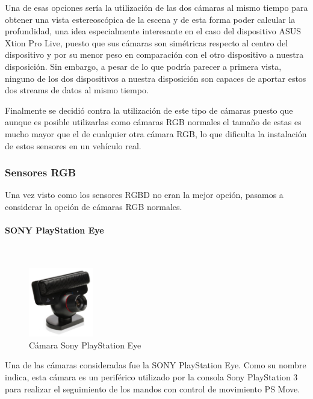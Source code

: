 Una de esas opciones sería la utilización de las dos cámaras al mismo tiempo para obtener una vista estereoscópica de la escena y de esta forma poder calcular la profundidad, una idea especialmente interesante en el caso del dispositivo ASUS Xtion Pro Live, puesto que sus cámaras son simétricas respecto al centro del dispositivo y por su menor peso en comparación con el otro dispositivo a nuestra disposición.
Sin embargo, a pesar de lo que podría parecer a primera vista, ninguno de los dos dispositivos a nuestra disposición son capaces de aportar estos dos streams de datos al mismo tiempo.

Finalmente se decidió contra la utilización de este tipo de cámaras puesto que aunque es posible utilizarlas como cámaras RGB normales el tamaño de estas es mucho mayor que el de cualquier otra cámara RGB, lo que dificulta la instalación de estos sensores en un vehículo real. 


\subsubsection{Sensores RGB}
Una vez visto como los sensores RGBD no eran la mejor opción, pasamos a considerar la opción de cámaras RGB normales.

\paragraph{SONY PlayStation Eye}\mbox{}\\

\begin{figure}[h!]
    \centering
    \includegraphics[width=0.25\textwidth]{img/sonyPSeye.jpg}
    \caption{Cámara Sony PlayStation Eye}
\end{figure}

Una de las cámaras consideradas fue la SONY PlayStation Eye. Como su nombre indica, esta cámara es un periférico utilizado por la consola Sony PlayStation 3 para realizar el seguimiento de los mandos con control de movimiento PS Move.

